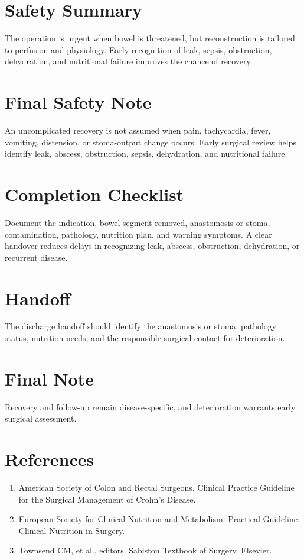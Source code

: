 \section*{Safety Summary}
The operation is urgent when bowel is threatened, but reconstruction is tailored to perfusion and physiology. Early recognition of leak, sepsis, obstruction, dehydration, and nutritional failure improves the chance of recovery.

\section*{Final Safety Note}
An uncomplicated recovery is not assumed when pain, tachycardia, fever, vomiting, distension, or stoma-output change occurs. Early surgical review helps identify leak, abscess, obstruction, sepsis, dehydration, and nutritional failure.

\section*{Completion Checklist}
Document the indication, bowel segment removed, anastomosis or stoma, contamination, pathology, nutrition plan, and warning symptoms. A clear handover reduces delays in recognizing leak, abscess, obstruction, dehydration, or recurrent disease.

\section*{Handoff}
The discharge handoff should identify the anastomosis or stoma, pathology status, nutrition needs, and the responsible surgical contact for deterioration.

\section*{Final Note}
Recovery and follow-up remain disease-specific, and deterioration warrants early surgical assessment.

\section*{References}
\begin{enumerate}
  \item American Society of Colon and Rectal Surgeons. Clinical Practice Guideline for the Surgical Management of Crohn's Disease.
  \item European Society for Clinical Nutrition and Metabolism. Practical Guideline: Clinical Nutrition in Surgery.
  \item Townsend CM, et al., editors. Sabiston Textbook of Surgery. Elsevier.
\end{enumerate}

\clearpage
